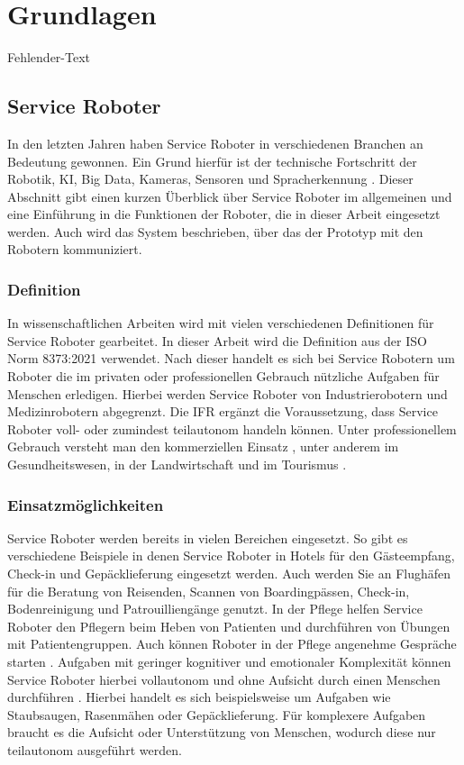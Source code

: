 \newpage
\section{Grundlagen}\label{Grundlagen}
Fehlender-Text

\subsection{Service Roboter}
In den letzten Jahren haben Service Roboter in verschiedenen Branchen an Bedeutung gewonnen. Ein Grund hierfür ist der technische Fortschritt der Robotik, KI, Big Data, Kameras, Sensoren und Spracherkennung \cite[S.~424]{Paluch2020}. Dieser Abschnitt gibt einen kurzen Überblick über Service Roboter im allgemeinen und eine Einführung in die Funktionen der Roboter, die in dieser Arbeit eingesetzt werden. Auch wird das System beschrieben, über das der Prototyp mit den Robotern kommuniziert.

\subsubsection{Definition}
In wissenschaftlichen Arbeiten wird mit vielen verschiedenen Definitionen für Service Roboter gearbeitet. In dieser Arbeit wird die Definition aus der ISO Norm 8373:2021 \cite[Kap.~3]{ISO2021} verwendet. Nach dieser handelt es sich bei Service Robotern um Roboter die im privaten oder professionellen Gebrauch nützliche Aufgaben für Menschen erledigen. Hierbei werden Service Roboter von Industrierobotern und Medizinrobotern abgegrenzt. Die \ac{IFR} \cite{IFR2024} ergänzt die Voraussetzung, dass Service Roboter voll- oder zumindest teilautonom handeln können. Unter professionellem Gebrauch versteht man den kommerziellen Einsatz \cite[S.~4]{GonzalezAguirre2021}, unter anderem im Gesundheitswesen, in der Landwirtschaft und im Tourismus \cite[S.~9]{GonzalezAguirre2021}.

\subsubsection{Einsatzmöglichkeiten}
Service Roboter werden bereits in vielen Bereichen eingesetzt. So gibt es verschiedene Beispiele in denen Service Roboter in Hotels für den Gästeempfang, Check-in und Gepäcklieferung eingesetzt werden. Auch werden Sie an Flughäfen für die Beratung von Reisenden, Scannen von Boardingpässen, Check-in, Bodenreinigung und Patrouilliengänge genutzt. In der Pflege helfen Service Roboter den Pflegern beim Heben von Patienten und durchführen von Übungen mit Patientengruppen. Auch können Roboter in der Pflege angenehme Gespräche starten \cite[S.~425-427]{Paluch2020}. Aufgaben mit geringer kognitiver und emotionaler Komplexität können Service Roboter hierbei vollautonom und ohne Aufsicht durch einen Menschen durchführen \cite[S.~429]{Paluch2020}. Hierbei handelt es sich beispielsweise um Aufgaben wie Staubsaugen, Rasenmähen oder Gepäcklieferung. Für komplexere Aufgaben braucht es die Aufsicht oder Unterstützung von Menschen, wodurch diese nur teilautonom ausgeführt werden.

